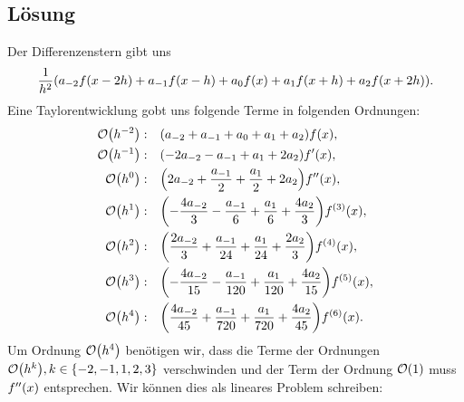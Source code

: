 \documentclass{exercise}
\begin{document}
    \subsection*{Lösung}
    Der Differenzenstern gibt uns
    \[
        \frac{1}{h^2}\parentheses*{a_{-2}f\parentheses*{x - 2h} + a_{-1}f\parentheses*{x - h} + a_0 f\parentheses*{x} + a_1 f\parentheses*{x + h} + a_2 f\parentheses*{x + 2h}}.
    \]
    Eine Taylorentwicklung gobt uns folgende Terme in folgenden Ordnungen:
    \begin{align*}
        \mathcal{O}\parentheses*{h^{-2}}: &\quad \parentheses*{a_{-2} + a_{-1} + a_0 + a_1 + a_2}f\parentheses*{x},\\
        \mathcal{O}\parentheses*{h^{-1}}: &\quad \parentheses*{-2a_{-2} - a_{-1} + a_1 + 2a_2}f'\parentheses*{x},\\
        \mathcal{O}\parentheses*{h^0}: &\quad \parentheses*{2a_{-2} + \frac{a_{-1}}{2} + \frac{a_1}{2} + 2a_2}f''\parentheses*{x},\\
        \mathcal{O}\parentheses*{h^1}: &\quad \parentheses*{-\frac{4a_{-2}}{3} - \frac{a_{-1}}{6} + \frac{a_1}{6} + \frac{4a_2}{3}}f^{\parentheses*{3}}\parentheses*{x},\\
        \mathcal{O}\parentheses*{h^2}: &\quad \parentheses*{\frac{2a_{-2}}{3} + \frac{a_{-1}}{24} + \frac{a_1}{24} + \frac{2a_2}{3}}f^{\parentheses*{4}}\parentheses*{x},\\
        \mathcal{O}\parentheses*{h^3}: &\quad \parentheses*{-\frac{4a_{-2}}{15} - \frac{a_{-1}}{120} + \frac{a_1}{120} + \frac{4a_2}{15}}f^{\parentheses*{5}}\parentheses*{x},\\
        \mathcal{O}\parentheses*{h^4}: &\quad \parentheses*{\frac{4a_{-2}}{45} + \frac{a_{-1}}{720} + \frac{a_1}{720} + \frac{4a_2}{45}}f^{\parentheses*{6}}\parentheses*{x}.
    \end{align*}
    Um Ordnung \(\mathcal{O}\parentheses*{h^4}\) benötigen wir, dass die Terme der Ordnungen \(\mathcal{O}\parentheses*{h^k}, k \in \braces*{-2, -1, 1, 2, 3}\) verschwinden und der Term der Ordnung \(\mathcal{O}\parentheses*{1}\) muss \(f''\parentheses*{x}\) entsprechen.
    Wir können dies als lineares Problem schreiben:
\end{document}
